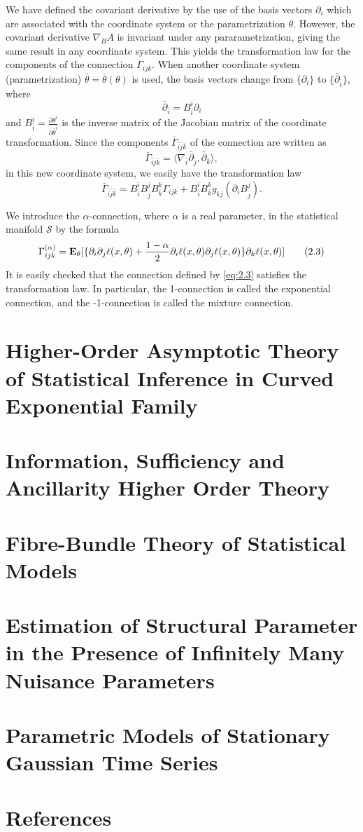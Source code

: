 \documentclass[11pt]{article}
\begin{document}
We have defined the covariant derivative by the use of the basis
vectors $\partial_i$ which are associated with the coordinate system
or the parametrization $\theta$.  However, the covariant derivative
$\nabla_B A$ is invariant under any pararametrization, giving the same
result in any coordinate system.  This yields the transformation law
for the components of the connection $\Gamma_{ijk}$.  When another
coordinate system (parametrization) $\bar{\theta} =
\bar{\theta}(\theta)$ is used, the basis vectors change from
$\{\partial_i\}$ to $\{\bar{\partial}_{\bar{i}}\}$, where
\[
\bar{\partial}_{\bar{i}} = B_{\bar{i}}^i \partial_i
\]
and $B_{\bar{i}}^i = \frac{\partial \theta^i}{\partial
  \bar{\theta}^{\bar{i}}}$ is the inverse matrix of the Jacobian
matrix of the coordinate transformation.  Since the components
$\bar{\Gamma}_{\bar{i}\bar{j}\bar{k}}$ of the connection are
written as
\[
\bar{\Gamma}_{\bar{i}\bar{j}\bar{k}} 
= \langle
\nabla_{\bar{i}} \bar{\partial}_{\bar{j}}, 
\bar{\partial}_{\bar{k}}
\rangle,
\]
in this new coordinate system, we easily have the transformation law
\[
\bar{\Gamma}_{\bar{i}\bar{j}\bar{k}} 
= B_{\bar{i}}^i B_{\bar{j}}^j B_{\bar{k}}^k \Gamma_{ijk}
+ B_{\bar{i}}^i B_{\bar{k}}^k g_{kj}(\partial_i B_{\bar{j}}^j).
\]

We introduce the $\alpha$-connection, where $\alpha$ is a real
parameter, in the statistical manifold $\mathcal{S}$ by the formula
\begin{equation}
\Gamma_{ijk}^{(\alpha)} = \textbf{E}_\theta[
\{
\partial_i \partial_j \ell(x,\theta) + 
\frac{1-\alpha}{2} \partial_i \ell(x, \theta) \partial_j \ell(x, \theta)
\} \partial_k \ell(x, \theta)
]\tag{2.3}\label{eq:2.3}
\end{equation}
It is easily checked that the connection defined by \eqref{eq:2.3}
satisfies the transformation law.  In particular, the 1-connection is
called the exponential connection, and the -1-connection is called the
mixture connection.

\section{Higher-Order Asymptotic Theory of Statistical Inference in Curved Exponential Family}

\section{Information, Sufficiency and Ancillarity Higher Order Theory}

\section{Fibre-Bundle Theory of Statistical Models}

\section{Estimation of Structural Parameter in the Presence of Infinitely Many Nuisance Parameters}

\section{Parametric Models of Stationary Gaussian Time Series}

\section{References}
\end{document}
